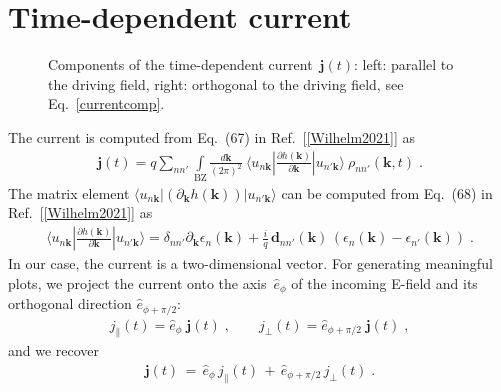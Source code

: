 \documentclass[11pt, a4paper]{scrartcl}
\newlength\figureheight
\newlength\figurewidth
\newcommand{\bk}{\mathbf{k}}
\newcommand{\bj}{\mathbf{j}}
\newcommand{\bd}{\mathbf{d}}
\newcommand{\eqt}{\,{=}\,}
\newcommand{\pt}{\,{+}\,}
\newcommand{\intbzdkpi}{\int\limits_\text{BZ}\frac{d\bk}{(2\pi)^2}}
\newcommand{\rhonnprime}{\rho_{nn'}(\bk,t)}
\begin{document}
\section{Time-dependent current}
\begin{figure}[b!]
\centering
\setlength\figureheight{7.5cm} 
\setlength\figurewidth{7.5cm}
\hfill
\caption{Components of the time-dependent current~$\bj(t)$: left: parallel to the driving field, right: orthogonal to the driving field, see Eq.~\eqref{currentcomp}.}
    \label{fig:current}
\end{figure}
The current is computed from Eq.~(67) in Ref.~[\ref{Wilhelm2021}] as
\begin{align}
 \bj(t)  =
q\sum_{nn'} \intbzdkpi
\ \langle u_{n\bk} |  \frac{\partial h(\bk)}{\partial \bk} | u_{n'\bk}\rangle \ \rhonnprime\;.\label{current}
\end{align} 
The matrix element $ \langle u_{n\bk} |  (\partial_\bk h(\bk)) | u_{n'\bk}\rangle$ can be computed from Eq.~(68) in Ref.~[\ref{Wilhelm2021}] as
\begin{align}
   \langle u_{n\bk} |  \frac{\partial h(\bk)}{\partial \bk} | u_{n'\bk}\rangle  = \delta_{nn'}\partial_\bk\epsilon_n(\bk) 
   +\frac{i}{q}\, \bd_{nn'}(\bk)\,(\epsilon_n(\bk)-\epsilon_{n'}(\bk)) \;.
\end{align}
%
In our case, the current is a two-dimensional vector. 
%
For generating meaningful plots, we project the current onto the axis~$\hat{e}_\phi$ of the incoming E-field and its orthogonal direction $\hat{e}_{\phi+\pi/2}$:
\begin{align}
    j_{\parallel}(t) = \hat{e}_\phi\;\bj(t)\;,\hspace{2em}
    j_{\bot}(t) = \hat{e}_{\phi+\pi/2}\;\bj(t)\;, 
    \label{currentcomp}
\end{align}
and we recover 
\begin{align}
\bj(t)\eqt\hat{e}_\phi\, j_{\parallel}(t)\pt\hat{e}_{\phi+\pi/2}\,j_{\bot}(t)\;.
    \label{currentdecomp}
\end{align}
\end{document}

